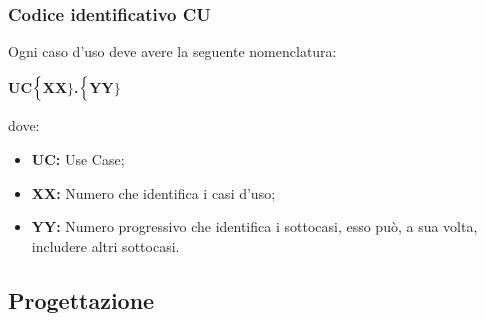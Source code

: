 \subsubsection{Codice identificativo CU}
Ogni caso d'uso deve avere la seguente nomenclatura:
\begin{center}
	\textbf{UC$\Bigl\{$XX$\Bigr\}$.$\Bigl\{$YY$\Bigr\}$}
\end{center}
dove:
\begin{itemize}
	\item \textbf{UC:} Use Case;
	\item \textbf{{XX}:} Numero che identifica i casi d'uso;
	\item \textbf{{YY}:} Numero progressivo che identifica i sottocasi, esso può, a sua volta, includere altri sottocasi.
\end{itemize}






\subsection{Progettazione} \label{progettazione}
